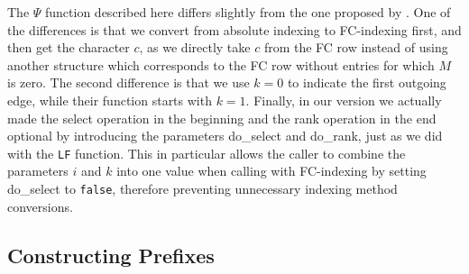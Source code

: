\documentclass[a4paper,12pt,twoside,BCOR=10mm]{scrbook}
\begin{document}
The $ \Psi $ function described here differs slightly from the one proposed by \citet{Siren2014}.
One of the differences is that we convert from absolute indexing to FC-indexing first,
and then get the character $ c $, as we directly take $ c $ from the FC row instead
of using another structure which corresponds to the FC row without entries for which $ M $ is zero.
The second difference is that we use $ k = 0 $ to indicate the first outgoing edge,
while their function starts with $ k = 1 $.
Finally, in our version we actually made the select operation in the beginning and the rank operation in
the end optional by introducing the parameters do\_select and do\_rank,
just as we did with the \texttt{LF} function.
This in particular allows the caller to combine the parameters $ i $ and $ k $ into one value
when calling with FC-indexing by setting do\_select to \texttt{false},
therefore preventing unnecessary indexing method conversions.


\subsection{Constructing Prefixes}
\label{sec:gml_flat_construct_prefixes}
\end{document}
